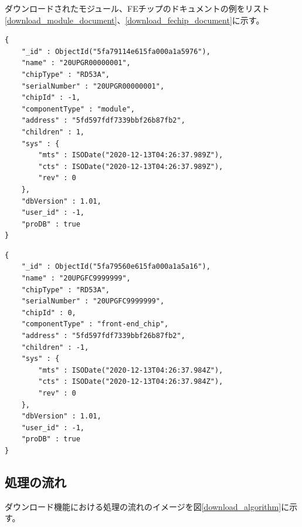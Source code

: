 ダウンロードされたモジュール、FEチップのドキュメントの例をリスト\ref{download_module_document}、\ref{download_fechip_document}に示す。
\begin{lstlisting}[basicstyle=\scriptsize,caption=ダウンロードしたモジュール情報のドキュメントの例。ドキュメントが表\ref{download_information}の情報を持つことが分かる。,label=download_module_document]
{
	"_id" : ObjectId("5fa79114e615fa000a1a5976"),
	"name" : "20UPGR00000001",
	"chipType" : "RD53A",
	"serialNumber" : "20UPGR00000001",
	"chipId" : -1,
	"componentType" : "module",
	"address" : "5fd597fdf7339bbf26b87fb2",
	"children" : 1,
	"sys" : {
		"mts" : ISODate("2020-12-13T04:26:37.989Z"),
		"cts" : ISODate("2020-12-13T04:26:37.989Z"),
		"rev" : 0
	},
	"dbVersion" : 1.01,
	"user_id" : -1,
	"proDB" : true
}
\end{lstlisting}
\begin{lstlisting}[basicstyle=\scriptsize,caption=ダウンロードしたFEチップ情報のドキュメントの例。ドキュメントが表\ref{download_information}の情報を持つことが分かる。,label=download_fechip_document]
{
	"_id" : ObjectId("5fa79560e615fa000a1a5a16"),
	"name" : "20UPGFC9999999",
	"chipType" : "RD53A",
	"serialNumber" : "20UPGFC9999999",
	"chipId" : 0,
	"componentType" : "front-end_chip",
	"address" : "5fd597fdf7339bbf26b87fb2",
	"children" : -1,
	"sys" : {
		"mts" : ISODate("2020-12-13T04:26:37.984Z"),
		"cts" : ISODate("2020-12-13T04:26:37.984Z"),
		"rev" : 0
	},
	"dbVersion" : 1.01,
	"user_id" : -1,
	"proDB" : true
}
\end{lstlisting}

\subsection{処理の流れ}

ダウンロード機能における処理の流れのイメージを図\ref{download_algorithm}に示す。

